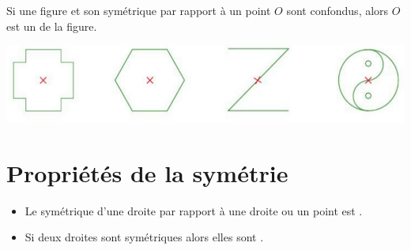 \documentclass[xcolor={dvipsnames}]{beamer}
\begin{document}
\begin{frame}
	\begin{mydef}
		Si une figure et son symétrique \pause par rapport à un point $O$ sont confondus, alors \pause $O$ est un  de la figure.\pause
		
	\end{mydef}
	
	\begin{myexs}
		\begin{center}
			\includegraphics[scale=0.5]{centres}
		\end{center}
	\end{myexs}
\end{frame}
\section{Propriétés de la symétrie}

\begin{frame}
	\begin{myprops}
		\begin{itemize}
			\item Le symétrique d'une droite par rapport \pause à une droite ou un point est \pause {}. \pause
			\item Si deux droites sont symétriques  \pause {} alors  \pause elles sont .
		\end{itemize}
	\end{myprops}
\end{frame}
\end{document}
